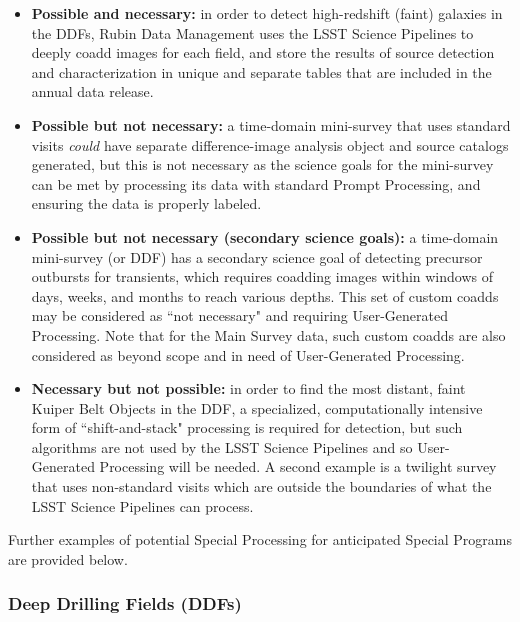 \begin{itemize}

\item \textbf{Possible and necessary:}
in order to detect high-redshift (faint) galaxies in the DDFs,
Rubin Data Management uses the LSST Science Pipelines to deeply
coadd images for each field, and store the results of source
detection and characterization in unique and separate tables that
are included in the annual data release.

\item \textbf{Possible but not necessary:}
a time-domain mini-survey that uses standard visits \emph{could}
have separate difference-image analysis object and source catalogs
generated, but this is not necessary as the science goals for the
mini-survey can be met by processing its data with standard Prompt
Processing, and ensuring the data is properly labeled.

\item \textbf{Possible but not necessary (secondary science goals):}
a time-domain mini-survey (or DDF) has a secondary science goal of detecting
precursor outbursts for transients, which requires coadding images
within windows of days, weeks, and months to reach various depths.
This set of custom coadds may be considered as ``not necessary" and requiring 
User-Generated Processing.
Note that for the Main Survey data, such custom coadds are also considered 
as beyond scope and in need of User-Generated Processing.

\item \textbf{Necessary but not possible:}
in order to find the most distant, faint Kuiper Belt Objects in the DDF,
a specialized, computationally intensive form of ``shift-and-stack" processing
is required for detection, but such algorithms are not used by the 
LSST Science Pipelines and so User-Generated Processing will be needed.
A second example is a twilight survey that uses non-standard visits 
which are outside the boundaries of what the LSST Science Pipelines can process.

\end{itemize}

Further examples of potential Special Processing for anticipated Special Programs are provided below.

\subsubsection{Deep Drilling Fields (DDFs)}\label{sssec:proc_special_ddf}

